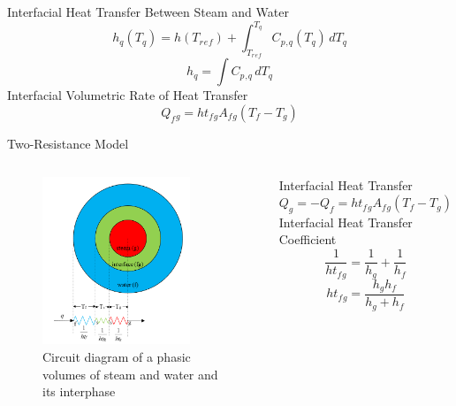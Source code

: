 \begin{frame}{Interfacial Heat Transfer Between Steam and Water}
    \begin{equation} \label{hq_eqn}
    h_q (T_q) = h (T_r{}_e{}_f) + \int_{T_r{}_e{}_f}^{T_q} C_p{}_,{}_q(T_q)\, dT_q
   \end{equation}
   \begin{equation} \label{hqs_eqn}
    h_q = \int C_p{}_,{}_q\, dT_q
  \end{equation}
  \centering Interfacial Volumetric Rate of Heat Transfer
  \begin{equation}\label{vht_eqn}
    Q_f{}_g = ht_f{}_g A_f{}_g (T_f-T_g)
  \end{equation}
\end{frame}

\begin{frame}{Two-Resistance Model}
\begin{columns}
    \begin{figure}
    \centering
    \includegraphics[height=5cm]{images/two resistance model.PNG}
    \caption{\centering Circuit diagram of a phasic volumes of steam and water and its interphase}
    \end{figure}
    \centering Interfacial Heat Transfer
    \begin{equation}\label{ihf_eqn}
    Q_g = -Q_f = ht_f{}_g A_f{}_g (T_f - T_g)
    \end{equation}
    \centering Interfacial Heat Transfer Coefficient
    \begin{equation}
    \frac{1}{ht_f{}_g} = \frac{1}{h_g} + \frac{1}{h_f}
    \end{equation}
    \begin{equation}
        ht_f{}_g = \frac{h_g h_f}{h_g + h_f}
    \end{equation}
\end{columns}
\end{frame}


